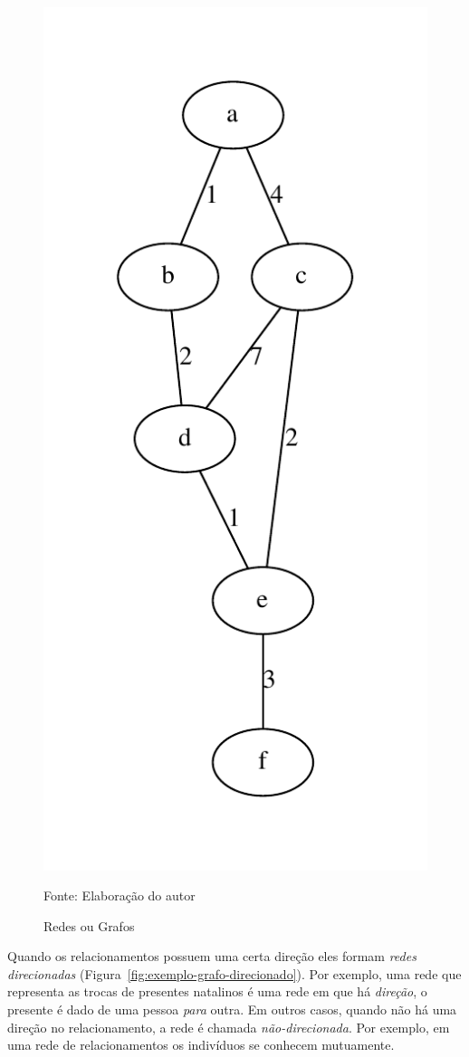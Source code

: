 \documentclass[12pt,a4paper]{article}
\theoremstyle{hypo}
\newcommand{\source}[1]{\vspace{-10pt} \caption*{Fonte: {#1}} }
\begin{document}
\begin{figure}[ht]
{        \includegraphics[scale=0.44]{weighted.pdf}
        \label{fig:exemplo-grafo-ponderado}
    }    
    \caption{Redes ou Grafos}
    \label{fig:exemplo-tipos-grafo}
    \source{Elaboração do autor}
\end{figure}

Quando os relacionamentos possuem uma certa direção eles formam \textit{redes direcionadas} (Figura~\ref{fig:exemplo-grafo-direcionado}). Por exemplo, uma rede que representa as trocas de presentes natalinos é uma rede em que há \textit{direção}, o presente é dado de uma pessoa \textit{para} outra. Em outros casos, quando não há uma direção no relacionamento, a rede é chamada \textit{não-direcionada}. Por exemplo, em uma rede de relacionamentos os indivíduos se conhecem mutuamente. 
\end{document}
